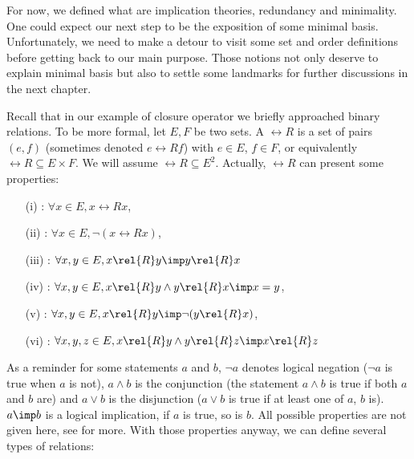 \vspace{1.2em}

For now, we defined what are implication theories, redundancy and minimality. 
One could expect our next step to be the exposition of some minimal basis. 
Unfortunately, we need to make a detour to visit some set and order definitions
before getting back to our main purpose. Those notions not only deserve to
explain minimal basis but also to settle some landmarks for further discussions 
in the next chapter.

\vspace{1.2em}

Recall that in our example of closure operator we briefly approached binary 
relations. To be more formal, let $E, F$ be two sets. A  $\rel{R}$ is a set of pairs $(e, f)$ (sometimes denoted 
$e \rel{R} f$) with $e \in E$, $f \in F$, or equivalently $\rel{R} \subseteq E 
\times F$. We will assume $\rel{R} \subseteq E^2$. Actually, $\rel{R}$ can 
present some properties:
\begin{itemize}
	\item[(i)] : $\forall x \in E, x\rel{R}x$,
	\item[(ii)] : $\forall x \in E, \lnot(x\rel{R}x)$,
	\item[(iii)] : $\forall x, y \in E, x \rel{R} y \imp y 
	\rel{R} x$
	\item[(iv)] : $\forall x, y \in E, x \rel{R} y \land 
	y \rel{R} x \imp x = y$,
	\item[(v)] : $\forall x, y \in E, x \rel{R} y \imp
	\lnot(y\rel{R}x)$,
	\item[(vi)] : $\forall x, y, z \in E, x \rel{R} y 
	\land y \rel{R} z \imp x \rel{R} z$
\end{itemize}
As a reminder for some statements $a$ and $b$, $\lnot a$ denotes logical negation ($\lnot a$ is true when $a$ is not), $a \land b$ is the conjunction (the statement $a \land b$ is true if both $a$ and $b$ are) and $a \lor b$ is the disjunction ($a \lor b$ is true if at least one of $a$, $b$ is). $a \imp b$ is a logical implication, if $a$ is true, so is $b$. All possible properties are not given here, see \cite{cori_mathematical_2000} 
for more. With those properties anyway, we can define several types of 
relations:


